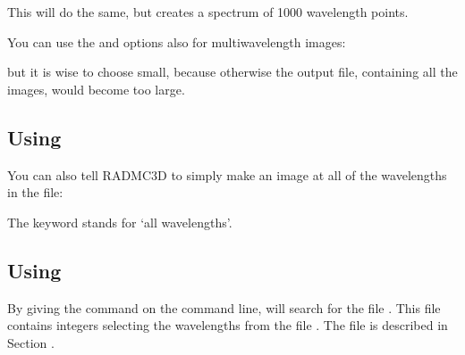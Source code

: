 \documentclass[letterpaper,10pt,english]{sphinxmanual}
\begin{document}
This will do the same, but creates a spectrum of 1000 wavelength points.

You can use the  and  options also for multi\sphinxhyphen{}wavelength
images:

\begin{sphinxVerbatim}[commandchars=\\\{\}]
          
\end{sphinxVerbatim}

but it is wise to choose  small, because otherwise the output file,
containing all the images, would become too large.


\subsection{Using }
\label{\detokenize{imagesspectra:using-allwl}}
You can also tell RADMC\sphinxhyphen{}3D to simply make an image at all of the wavelengths in
the  file:

\begin{sphinxVerbatim}[commandchars=\\\{\}]
      
\end{sphinxVerbatim}

The keyword  stands for ‘all wavelengths’.


\subsection{Using }
\label{\detokenize{imagesspectra:using-loadcolor}}
By giving the command  on the command line,  will search
for the file . This file contains integers selecting the
wavelengths from the file . The file is described in
Section {\hyperref[\detokenize{inputoutputfiles:sec-color-inus}]{}}.
\end{document}
